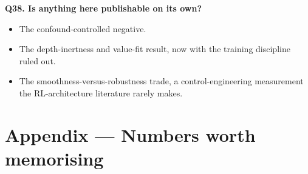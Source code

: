 \documentclass[11pt]{article}
\begin{document}
\textbf{Q38. Is anything here publishable on its own?}

\begin{itemize}
\item The confound-controlled negative.
\item The depth-inertness and value-fit result, now with the training discipline ruled out.
\item The smoothness-versus-robustness trade, a control-engineering measurement the RL-architecture literature rarely makes.
\end{itemize}



\medskip



\section*{Appendix --- Numbers worth memorising}
\end{document}
